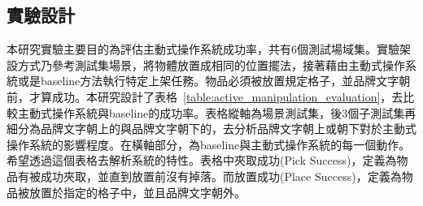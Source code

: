 \subsection{實驗設計}
本研究實驗主要目的為評估主動式操作系統成功率，共有6個測試場域集。實驗架設方式乃參考測試集場景，將物體放置成相同的位置擺法，接著藉由主動式操作系統或是baseline方法執行特定上架任務。物品必須被放置規定格子，並品牌文字朝前，才算成功。本研究設計了表格~\ref{table:active_manipulation_evaluation}，去比較主動式操作系統與baseline的成功率。表格縱軸為場景測試集，後3個子測試集再細分為品牌文字朝上的與品牌文字朝下的，去分析品牌文字朝上或朝下對於主動式操作系統的影響程度。在橫軸部分，為baseline與主動式操作系統的每一個動作。希望透過這個表格去解析系統的特性。表格中夾取成功(Pick Success)，定義為物品有被成功夾取，並直到放置前沒有掉落。而放置成功(Place Success)，定義為物品被放置於指定的格子中，並且品牌文字朝外。

